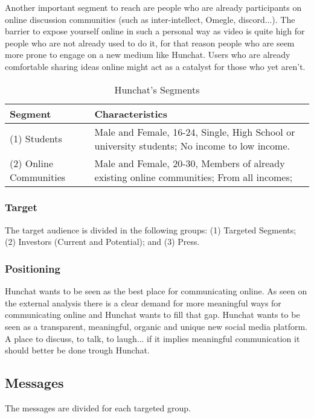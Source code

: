 \documentclass[12pt]{article}
\begin{document}
Another important segment to reach are people who are already participants on online discussion communities (such as inter-intellect, Omegle, discord...). The barrier to expose yourself online in such a personal way as video is quite high for people who are not already used to do it, for that reason people who are seem more prone to engage on a new medium like Hunchat. Users who are already comfortable sharing ideas online might act as a catalyst for those who yet aren't. 

\begin{table}[htbp]
\small
\caption{Hunchat's Segments}
\label{table:seg}
\centering
\begin{tabular}{ @{}P{0.2\textwidth}P{0.7\textwidth}@{} }
Segment	&	Characteristics	\\ \hline
(1) Students	&	Male and Female, 16-24, Single, High School or university students; No income to low income. \\
(2) Online Communities	& Male and Female, 20-30, Members of already existing online communities; From all incomes;
 \\ \hline
\end{tabular}
\end{table}

\subsubsection{Target}
The target audience is divided in the following groups: (1) Targeted Segments; (2) Investors (Current and Potential); and (3) Press.

\subsubsection{Positioning}
Hunchat wants to be seen as the best place for communicating online. As seen on the external analysis there is a clear demand for more meaningful ways for communicating online and Hunchat wants to fill that gap. Hunchat wants to be seen as a transparent, meaningful, organic and unique new social media platform. A place to discuss, to talk, to laugh... if it implies meaningful communication it should better be done trough Hunchat.


\subsection{Messages}
The messages are divided for each targeted group.
\end{document}
